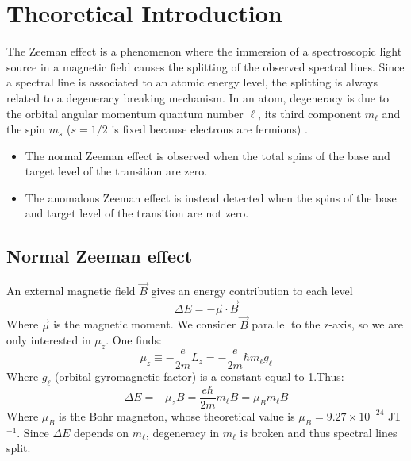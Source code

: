 \documentclass[a4paper,12pt,abstracton]{scrartcl}
\begin{document}
\section{Theoretical Introduction}\label{sec: ThIntro}
The Zeeman effect is a phenomenon where the immersion of a spectroscopic light source in a magnetic field causes the splitting of the observed spectral lines. Since a spectral line is associated to an atomic energy level, the splitting is always related to a degeneracy breaking mechanism. In an atom, degeneracy is due to the orbital angular momentum quantum number $\ell$, its third component $m_\ell$ and the spin $m_s$ ($s=1/2$ is fixed  because electrons are fermions) .
\begin{itemize}
    \item The normal Zeeman effect is observed when the total spins of the base and target level of the transition are zero.
    \item The anomalous Zeeman effect is instead detected when the spins of the base and target level of the transition are not zero.
\end{itemize}
\subsection{Normal Zeeman effect}
An external magnetic field $\vec{B}$ gives an energy contribution to each level
\begin{equation}
\Delta E = - \vec{\mu} \cdot \vec{B}
\end{equation}
Where $\vec{\mu}$ is the magnetic moment. We consider $\vec{B}$ parallel to the z-axis, so we are only interested in $\mu_z$. One finds: 
\begin{equation}
\mu_z \equiv -\frac{e}{2m}L_z = -\frac{e}{2m}\hbar m_\ell g_\ell 
\end{equation}
Where $g_\ell$ (orbital gyromagnetic factor) is a constant equal to 1.Thus:
\begin{equation}
\Delta E = - \mu_z B = \frac{e \hbar}{2m} m_\ell B = \mu_B m_\ell B
\end{equation}
Where $\mu_B$ is the Bohr magneton, whose theoretical value is
$\mu_B = 9.27 \times 10^{-24}$ JT$^{-1}$. Since $\Delta E$ depends on $m_\ell$, degeneracy in $m_\ell$ is broken and thus spectral lines split.
\end{document}
